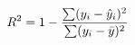 \documentclass[preview]{standalone}
\begin{document}
\begin{align*}
\special{dvisvgm:raw <g id='unique000'>}R^2 = 1 - \frac{\sum (y_i - \hat{y}_i)^2}{\sum (y_i - \bar{y})^2}\special{dvisvgm:raw </g>}
\end{align*}
\end{document}
